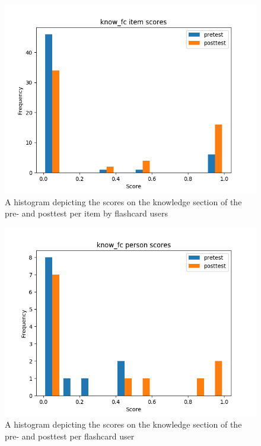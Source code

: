 \begin{figure}
    \centering
    \includegraphics[width=.7\textwidth]{img/know_fc_diff.png}
    \caption{A histogram depicting the scores on the knowledge section of the pre- and posttest per item by flashcard users}
    \label{fig:know_fc_diff}
\end{figure}
\begin{figure}
    \centering
    \includegraphics[width=.7\textwidth]{img/know_fc_abil.png}
    \caption{A histogram depicting the scores on the knowledge section of the pre- and posttest per flashcard user}
    \label{fig:know_fc_abil}
\end{figure}

